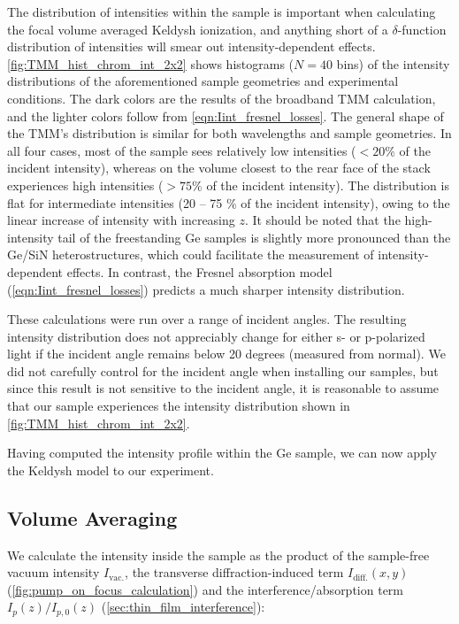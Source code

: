 The distribution of intensities within the sample is important when calculating the focal volume averaged Keldysh ionization, and anything short of a $\delta$-function distribution of intensities will smear out intensity-dependent effects. \cref{fig:TMM_hist_chrom_int_2x2} shows histograms ($N = 40$ bins) of the intensity distributions of the aforementioned sample geometries and experimental conditions. The dark colors are the results of the broadband TMM calculation, and the lighter colors follow from \cref{eqn:Iint_fresnel_losses}. The general shape of the TMM's distribution is similar for both wavelengths and sample geometries. In all four cases, most of the sample sees relatively low intensities ($<20\%$ of the incident intensity), whereas on the volume closest to the rear face of the stack experiences high intensities ($>75\%$ of the incident intensity). The distribution is flat for intermediate intensities ({20 -- 75 \%} of the incident intensity), owing to the linear increase of intensity with increasing $z$. It should be noted that the high-intensity tail of the freestanding Ge samples is slightly more pronounced than the Ge/SiN heterostructures, which could facilitate the measurement of intensity-dependent effects. In contrast, the Fresnel absorption model (\cref{eqn:Iint_fresnel_losses}) predicts a much sharper intensity distribution.

These calculations were run over a range of incident angles. The resulting intensity distribution does not appreciably change for either s- or p-polarized light if the incident angle remains below 20 degrees (measured from normal). We did not carefully control for the incident angle when installing our samples, but since this result is not sensitive to the incident angle, it is reasonable to assume that our sample experiences the intensity distribution shown in \cref{fig:TMM_hist_chrom_int_2x2}.

Having computed the intensity profile within the Ge sample, we can now apply the Keldysh model to our experiment.

\subsection{Volume Averaging}
\label{sec:volume_averaging}

We calculate the intensity inside the sample as the product of the sample-free vacuum intensity $I_{\textrm{vac.}}$, the transverse diffraction-induced term $I_{\textrm{diff.}}(x, y)$ (\cref{fig:pump_on_focus_calculation}) and the interference/absorption term $I_p(z) / I_{p,0}(z)$ (\cref{sec:thin_film_interference}):

